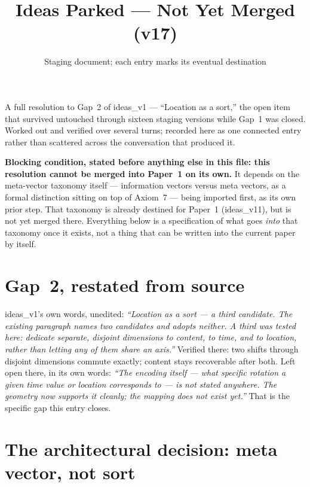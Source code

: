 \documentclass[11pt]{article}
\title{Ideas Parked --- Not Yet Merged (v17)}
\author{Staging document; each entry marks its eventual destination}
\date{}
\begin{document}
\maketitle

\noindent A full resolution to Gap~2 of ideas\_v1 --- ``Location as
a sort,'' the open item that survived untouched through sixteen
staging versions while Gap~1 was closed. Worked out and verified
over several turns; recorded here as one connected entry rather than
scattered across the conversation that produced it.

\textbf{Blocking condition, stated before anything else in this
file: this resolution cannot be merged into Paper~1 on its own.} It
depends on the meta-vector taxonomy itself --- information vectors
versus meta vectors, as a formal distinction sitting on top of
Axiom~7 --- being imported first, as its own prior step. That
taxonomy is already destined for Paper~1 (ideas\_v11), but is not
yet merged there. Everything below is a specification of what goes
\emph{into} that taxonomy once it exists, not a thing that can be
written into the current paper by itself.

\section{Gap~2, restated from source}

ideas\_v1's own words, unedited: \emph{``Location as a sort --- a
third candidate. The existing paragraph names two candidates and
adopts neither. A third was tested here: dedicate separate, disjoint
dimensions to content, to time, and to location, rather than letting
any of them share an axis.''} Verified there: two shifts through
disjoint dimensions commute exactly; content stays recoverable after
both. Left open there, in its own words: \emph{``The encoding itself
--- what specific rotation a given time value or location corresponds
to --- is not stated anywhere. The geometry now supports it cleanly;
the mapping does not exist yet.''} That is the specific gap this
entry closes.

\section{The architectural decision: meta vector, not sort}
\end{document}
